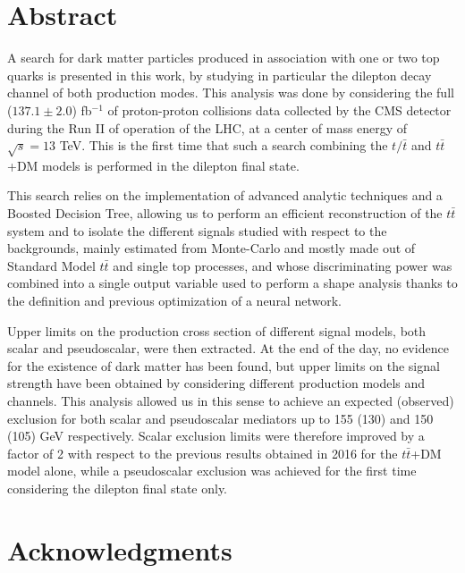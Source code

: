 \documentclass[a4paper, 10pt, openright]{report}
\begin{document}

\thispagestyle{empty}
\phantom{a}
\vfill
\newpage


\setlength{\parskip}{5pt}
\setcounter{page}{1}

\chapter*{Abstract}

A search for dark matter particles produced in association with one or two top quarks is presented in this work, by studying in particular the dilepton decay channel of both production modes. This analysis was done by considering the full ($137.1 \pm 2.0$) fb$^{-1}$ of proton-proton collisions data collected by the \ac{CMS} detector during the Run II of operation of the \ac{LHC}, at a center of mass energy of $\sqrt{s} = 13$ TeV. This is the first time that such a search combining the $t/\bar t$ and $t \bar t$+DM models is performed in the dilepton final state.

This search relies on the implementation of advanced analytic techniques and a Boosted Decision Tree, allowing us to perform an efficient reconstruction of the $t \bar t$ system and to isolate the different signals studied with respect to the backgrounds, mainly estimated from Monte-Carlo and mostly made out of Standard Model $t \bar t$ and single top processes, and whose discriminating power was combined into a single output variable used to perform a shape analysis thanks to the definition and previous optimization of a neural network.

Upper limits on the production cross section of different signal models, both scalar and pseudoscalar, were then extracted. At the end of the day, no evidence for the existence of dark matter has been found, but upper limits on the signal strength have been obtained by considering different production models and channels. This analysis allowed us in this sense to achieve an expected (observed) exclusion for both scalar and pseudoscalar mediators up to 155 (130) and 150 (105) GeV respectively. Scalar exclusion limits were therefore improved by a factor of 2 with respect to the previous results obtained in 2016 for the $t \bar t$+DM model alone, while a pseudoscalar exclusion was achieved for the first time considering the dilepton final state only.

\chapter*{Acknowledgments}
\end{document}
